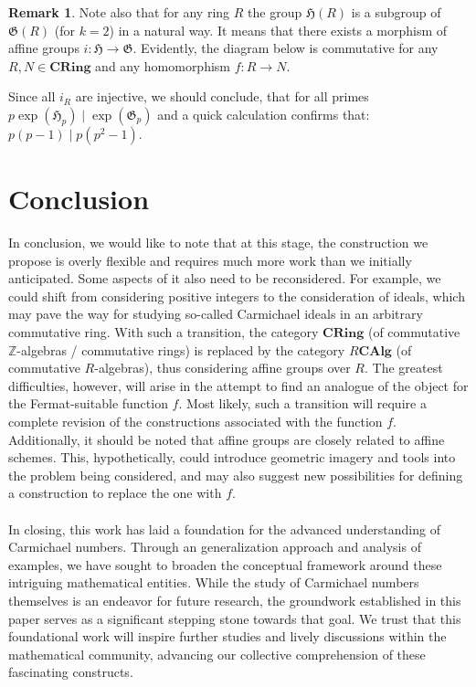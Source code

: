 \documentclass{article}
\theoremstyle{definition}
\theoremstyle{definition}
\newtheorem{remark}{Remark}[section]
\begin{document}
\begin{remark}
    Note also that for any ring $R$ the group $\mathfrak{H}(R)$ is a subgroup of $\mathfrak{G}(R)$ (for $k=2$) in a natural way. 
    It means that there exists a morphism of affine groups $i:\mathfrak{H} \xrightarrow{} \mathfrak{G}$.
    Evidently, the diagram below is commutative for any $R,N \in \mathbf{CRing}$ and any homomorphism $f:R \xrightarrow{} N$. 
\begin{center}
\end{center}
Since all $i_R$ are injective, we should conclude, that for all primes 
$p\operatorname{exp}(\mathfrak{H}_p) \mid \operatorname{exp}(\mathfrak{G}_p)$ and a quick calculation confirms that: 
$p(p-1) \mid p(p^2-1).$
\end{remark}


\section{Conclusion}

In conclusion, we would like to note that at this stage, the construction we propose is overly flexible and requires much more work 
than we initially anticipated. Some aspects of it also need to be reconsidered. For example, we could shift from considering positive 
integers to the consideration of ideals, which may pave the way for studying so-called Carmichael ideals in an arbitrary commutative 
ring. With such a transition, the category $\mathbf{CRing}$ (of commutative
$\mathbb{Z}$-algebras / commutative rings) is replaced by the category $R$\makebox[0.5em][c]{-}$\mathbf{CAlg}$ (of commutative 
$R$-algebras), thus considering affine groups over $R.$ The greatest difficulties, however, will arise in the attempt to find an 
analogue of the object for the Fermat-suitable function $f$. Most likely, such a transition will require a complete revision of 
the constructions associated with the function 
$f$.\\
Additionally, it should be noted that affine groups are closely related to affine schemes. This, hypothetically, 
could introduce geometric imagery and tools into the problem being considered, and may also suggest new possibilities 
for defining a construction to replace the one with $f$.\\\\
In closing, this work has laid a foundation for the advanced understanding of Carmichael numbers. Through an generalization 
approach and analysis of examples, we have sought to broaden the conceptual framework around these intriguing mathematical 
entities. While the study of Carmichael numbers themselves is an endeavor for future research, the groundwork established 
in this paper serves as a significant stepping stone towards that goal. We trust that this foundational work will inspire 
further studies and lively discussions within the mathematical community, advancing our collective comprehension of these 
fascinating constructs.
\end{document}
